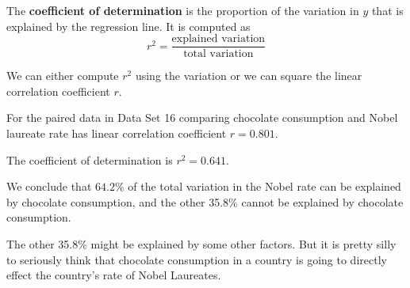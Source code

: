 \documentclass{beamer}
\begin{document}
\begin{frame}
\begin{definition}
The \textbf{coefficient of determination} is the proportion of the variation in $y$ that is explained by the regression line. It is computed as
\begin{equation*}
r^2 = \dfrac{\text{explained variation}}{\text{total variation}}
\end{equation*}
\end{definition}\pause

\begin{note}
We can either compute $r^2$ using the variation or we can square the linear correlation coefficient $r$.
\end{note}
\end{frame}

\begin{frame}
\begin{example}
For the paired data in Data Set 16 comparing chocolate consumption and Nobel laureate rate has linear correlation coefficient $r=0.801$.\pause

\vspace{2mm} 
The coefficient of determination is $r^2=0.641$.\pause

\vspace{2mm}
We conclude that $64.2\%$ of the total variation in the Nobel rate can be explained by chocolate consumption, and the other 35.8\% cannot be explained by chocolate consumption.\pause
\end{example}

\begin{note}
The other 35.8\% might be explained by some other factors. But it is pretty silly to seriously think that chocolate consumption in a country is going to directly effect the country's rate of Nobel Laureates.
\end{note}
\end{frame}
\end{document}
